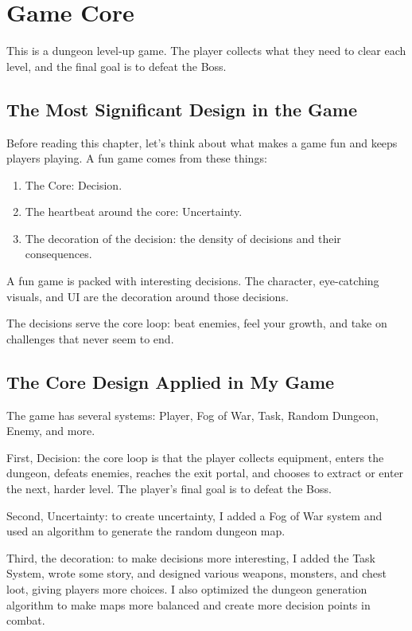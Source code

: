 \section{Game Core}

This is a dungeon level-up game. The player collects what they need to clear each level, and the final goal is to defeat the Boss.

\subsection{The Most Significant Design in the Game}

Before reading this chapter, let's think about what makes a game fun and keeps players playing. A fun game comes from these things:

\begin{enumerate}
  \item The Core: Decision.
  \item The heartbeat around the core: Uncertainty.
  \item The decoration of the decision: the density of decisions and their consequences.
\end{enumerate}

A fun game is packed with interesting decisions. The character, eye-catching visuals, and UI are the decoration around those decisions.

The decisions serve the core loop: beat enemies, feel your growth, and take on challenges that never seem to end.

\subsection{The Core Design Applied in My Game}

The game has several systems: Player, Fog of War, Task, Random Dungeon, Enemy, and more.

First, Decision: the core loop is that the player collects equipment, enters the dungeon, defeats enemies, reaches the exit portal, and chooses to extract or enter the next, harder level. The player's final goal is to defeat the Boss.

Second, Uncertainty: to create uncertainty, I added a Fog of War system and used an algorithm to generate the random dungeon map.

Third, the decoration: to make decisions more interesting, I added the Task System, wrote some story, and designed various weapons, monsters, and chest loot, giving players more choices. I also optimized the dungeon generation algorithm to make maps more balanced and create more decision points in combat.
